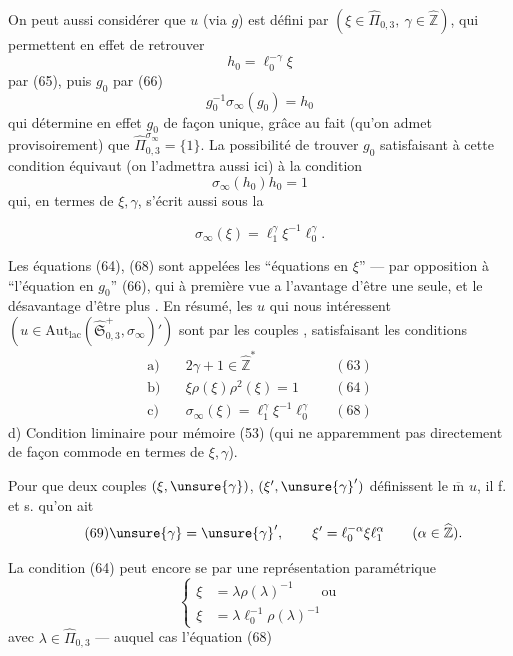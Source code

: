 On peut aussi considérer que  $u$ (via $g$) est défini par
$(\xi\in\widehat{\Pi}_{0,3},\ \gamma\in\widehat{\mathbb Z})$, qui permettent en effet de retrouver
\[
h_0=\ell_0^{-\gamma}\xi
\]
par (65), puis $g_0$ par (66)
\[
g_0^{-1}\sigma_\infty(g_0)=h_0
\]
qui détermine en effet $g_0$ de façon unique, grâce au fait (qu'on admet provisoirement)
que $\widehat{\Pi}_{0,3}^{\sigma_\infty}=\{1\}$.
La possibilité de trouver $g_0$ satisfaisant à cette condition équivaut (on l'admettra aussi ici) à la condition
\[
\tag{67}
\sigma_\infty(h_0)h_0=1
\]
qui, en termes de $\xi,\gamma$, s'écrit aussi sous la 


\[
\tag{68}
\boxed{\sigma_\infty(\xi)=\ell_1^\gamma\xi^{-1}\ell_0^\gamma}.
\]

Les équations (64), (68) sont appelées les ``équations en $\xi$'' --- par opposition à ``l'équation en $g_0$'' (66), qui à première vue a l'avantage d'être une seule, et le désavantage d'être plus .
En résumé, les $u$ qui nous intéressent
$(u\in\mathrm{Aut}_{\mathrm{lac}}(\widehat{\mathfrak S}_{0,3}^{+},\sigma_\infty)')$
sont  par les couples
\deleted{$\unsure{(\xi,\gamma)}$}, satisfaisant les conditions
\[
\begin{aligned}
\text{a)}\quad&2\gamma+1\in\widehat{\mathbb Z}^{*} &&(63)\\
\text{b)}\quad&\xi\rho(\xi)\rho^2(\xi)=1 &&(64)\\
\text{c)}\quad&\sigma_\infty(\xi)=\ell_1^\gamma\xi^{-1}\ell_0^\gamma &&(68)
\end{aligned}
\]
d) Condition liminaire pour mémoire (53)
(qui ne  apparemment pas directement de façon commode en termes de $\xi,\gamma$).

Pour que deux couples $(\xi,\unsure{\gamma})$, $(\xi',\unsure{\gamma}')$ définissent le $\overline{\mathrm m}$ $u$, il f. et s. qu'on ait
\[
\tag{69}
\unsure{\gamma}=\unsure{\gamma}',\qquad
\xi'=\ell_0^{-\alpha}\xi \ell_1^\alpha\qquad(\alpha\in\widehat{\mathbb Z}).
\]

La condition (64) peut encore se  par une représentation paramétrique
\[
\tag{70}
\left\{
\begin{aligned}
\xi&=\lambda\rho(\lambda)^{-1}\qquad\text{ou}\\
\xi&=\lambda \ell_0^{-1}\rho(\lambda)^{-1}
\end{aligned}
\right.
\]
avec $\lambda\in\widehat{\Pi}_{0,3}$ --- auquel cas l'équation (68)


